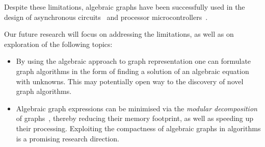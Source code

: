 Despite these limitations, algebraic graphs have been successfully used
in the design of asynchronous circuits~\cite{2015_beaumont_concepts} and
processor microcontrollers~\cite{2014_algebra_mokhov}.

Our future research will focus on addressing the limitations, as well as on
exploration of the following topics:

\begin{itemize}
    \item By using the algebraic approach to graph representation one can
    formulate graph algorithms in the form of finding a solution of an algebraic
    equation with unknowns.
    This may potentially open way to the discovery of novel graph algorithms.
    \item Algebraic graph expressions can be minimised via the
    \emph{modular decomposition} of graphs~\cite{2005_mcconnell_modular}, thereby
    reducing their memory footprint, as well as speeding up their processing.
    Exploiting the compactness of algebraic graphs in algorithms is a
    promising research direction.
\end{itemize}

